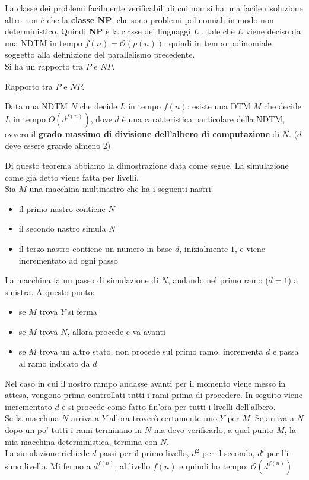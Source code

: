 La classe dei problemi facilmente verificabili di cui non si ha una facile risoluzione altro non è che la \textbf{classe NP}, che sono problemi polinomiali in modo non deterministico. Quindi \textbf{NP} è la classe dei linguaggi $L$ , tale che $L$ viene deciso da una NDTM in tempo $f(n) = \mathcal{O}(p(n))$, quindi in tempo polinomiale soggetto alla definizione del parallelismo precedente.\\

Si ha un rapporto tra $P$ e $NP$.
\begin{teorema}{Rapporto tra $P$ e $NP$.}{}\par
    Data una NDTM $N$ che decide $L$ in tempo $f(n)$: esiste una DTM $M$ che decide $L$ in tempo $O(d^{f(n)})$, dove $d$ è una caratteristica particolare della NDTM, ovvero il \textbf{grado massimo di divisione dell'albero di computazione} di $N$. ($d$ deve essere grande almeno 2)
\end{teorema}
Di questo teorema abbiamo la dimostrazione data come segue. La simulazione come già detto viene fatta per livelli. \\
Sia $M$ una macchina multinastro che ha i seguenti nastri:
\begin{itemize}
    \item il primo nastro contiene $N$
    \item il secondo nastro simula $N$
    \item il terzo nastro contiene un numero in base $d$, inizialmente $1$, e viene incrementato ad ogni passo
\end{itemize}
La macchina fa un passo di simulazione di $N$, andando nel primo ramo ($d=1$) a sinistra. A questo punto:
  \begin{itemize}
    \item se $M$ trova $Y$ si ferma
    \item se $M$ trova $N$, allora procede e va avanti
    \item se $M$ trova un altro stato, non procede sul primo ramo, incrementa $d$ e passa al ramo indicato da $d$
\end{itemize}
Nel caso in cui il nostro rampo andasse avanti per il momento viene messo in attesa, vengono prima controllati tutti i rami prima di procedere. In seguito viene incrementato $d$ e si procede come fatto fin'ora per tutti i livelli dell'albero. \\

Se la macchina $N$ arriva a $Y$ allora troverò certamente uno $Y$ per $M$. Se arriva a $N$ dopo un po' tutti i rami terminano in $N$ ma devo verificarlo, a quel punto $M$, la mia macchina deterministica, termina con $N$.\\ 
La simulazione richiede $d$ passi per il primo livello, $d^2$ per il secondo, $d^i$ per l'i-simo livello. Mi fermo a $d^{f(n)}$, al livello $f(n)$ e quindi ho tempo:   $\mathcal{O}(d^{f(n)})$\\

